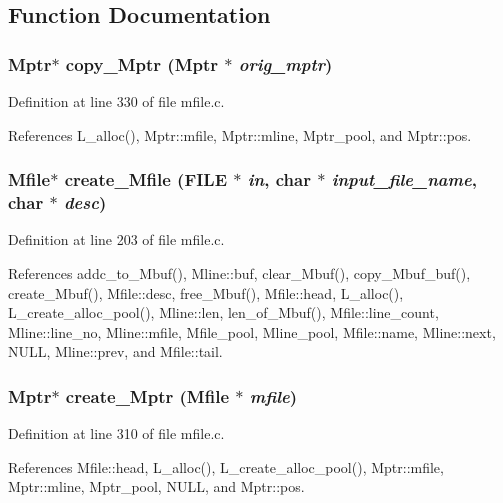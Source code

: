 \subsection{Function Documentation}
\subsubsection{\setlength{\rightskip}{0pt plus 5cm}\bf{Mptr}$\ast$ copy\_\-Mptr (\bf{Mptr} $\ast$ {\em orig\_\-mptr})}\label{mfile_8c_e4de11aabd9bbe6c94fbd767a635472e}




Definition at line 330 of file mfile.c.

References L\_\-alloc(), Mptr::mfile, Mptr::mline, Mptr\_\-pool, and Mptr::pos.
\subsubsection{\setlength{\rightskip}{0pt plus 5cm}\bf{Mfile}$\ast$ create\_\-Mfile (FILE $\ast$ {\em in}, char $\ast$ {\em input\_\-file\_\-name}, char $\ast$ {\em desc})}\label{mfile_8c_a2e916b84e74841612e659290c2b2ec2}




Definition at line 203 of file mfile.c.

References addc\_\-to\_\-Mbuf(), Mline::buf, clear\_\-Mbuf(), copy\_\-Mbuf\_\-buf(), create\_\-Mbuf(), Mfile::desc, free\_\-Mbuf(), Mfile::head, L\_\-alloc(), L\_\-create\_\-alloc\_\-pool(), Mline::len, len\_\-of\_\-Mbuf(), Mfile::line\_\-count, Mline::line\_\-no, Mline::mfile, Mfile\_\-pool, Mline\_\-pool, Mfile::name, Mline::next, NULL, Mline::prev, and Mfile::tail.
\subsubsection{\setlength{\rightskip}{0pt plus 5cm}\bf{Mptr}$\ast$ create\_\-Mptr (\bf{Mfile} $\ast$ {\em mfile})}\label{mfile_8c_1e4ac468a7c460378f6752e97b392b25}




Definition at line 310 of file mfile.c.

References Mfile::head, L\_\-alloc(), L\_\-create\_\-alloc\_\-pool(), Mptr::mfile, Mptr::mline, Mptr\_\-pool, NULL, and Mptr::pos.

